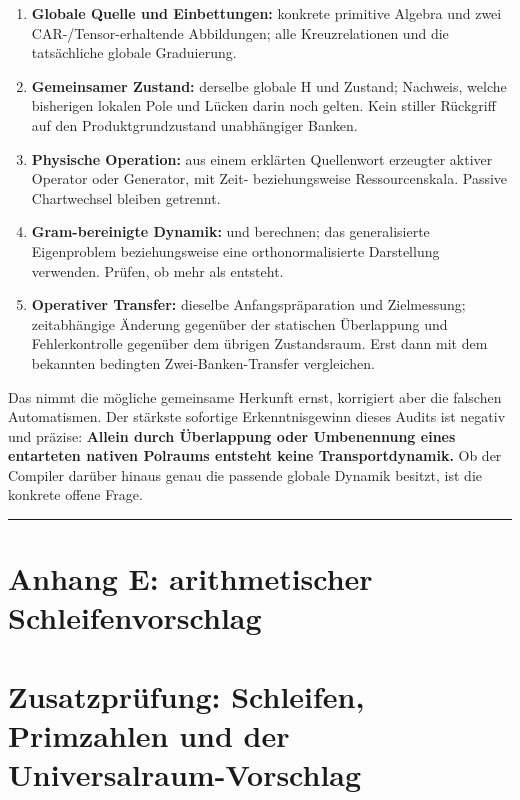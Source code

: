 \begin{enumerate}
\def\labelenumi{\arabic{enumi}.}
\tightlist
\item
  \textbf{Globale Quelle und Einbettungen:} konkrete primitive Algebra
  und zwei CAR-/Tensor-erhaltende Abbildungen; alle Kreuzrelationen und
  die tatsächliche globale Graduierung.
\item
  \textbf{Gemeinsamer Zustand:} derselbe globale H und Zustand;
  Nachweis, welche bisherigen lokalen Pole und Lücken darin noch gelten.
  Kein stiller Rückgriff auf den Produktgrundzustand unabhängiger
  Banken.
\item
  \textbf{Physische Operation:} aus einem erklärten Quellenwort
  erzeugter aktiver Operator oder Generator, mit Zeit- beziehungsweise
  Ressourcenskala. Passive Chartwechsel bleiben getrennt.
\item
  \textbf{Gram-bereinigte Dynamik:}  und
   berechnen; das generalisierte
  Eigenproblem beziehungsweise eine orthonormalisierte Darstellung
  verwenden. Prüfen, ob mehr als  entsteht.
\item
  \textbf{Operativer Transfer:} dieselbe Anfangspräparation und
  Zielmessung; zeitabhängige Änderung gegenüber der statischen
  Überlappung und Fehlerkontrolle gegenüber dem übrigen Zustandsraum.
  Erst dann mit dem bekannten bedingten Zwei-Banken-Transfer
  vergleichen.
\end{enumerate}

Das nimmt die mögliche gemeinsame Herkunft ernst, korrigiert aber die
falschen Automatismen. Der stärkste sofortige Erkenntnisgewinn dieses
Audits ist negativ und präzise: \textbf{Allein durch Überlappung oder
Umbenennung eines entarteten nativen Polraums entsteht keine
Transportdynamik.} Ob der Compiler darüber hinaus genau die passende
globale Dynamik besitzt, ist die konkrete offene Frage.

\begin{center}\rule{0.5\linewidth}{0.5pt}\end{center}

\section{Anhang E: arithmetischer
Schleifenvorschlag}\label{anhang-e-arithmetischer-schleifenvorschlag}

\section{Zusatzprüfung: Schleifen, Primzahlen und der
Universalraum-Vorschlag}\label{zusatzpruxfcfung-schleifen-primzahlen-und-der-universalraum-vorschlag}

